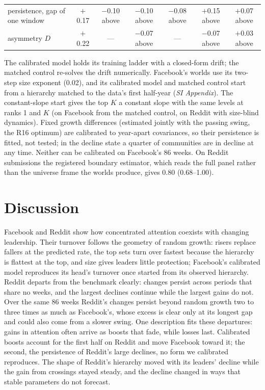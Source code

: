 \documentclass[9pt,twocolumn,twoside]{pnas-new}
\begin{document}
\begin{table}[tbp]
\begin{tabular}{lcccccc}
persistence, gap of one window & $+$0.17 & $-$0.10 above & $-$0.10 above & $-$0.08 above & $+$0.15 above & $+$0.07 above \\
asymmetry $D$ & $+$0.22 & --- & $-$0.07 above & --- & $-$0.07 above & $+$0.03 above \\
\end{tabular}
\vskip3pt\raggedright\footnotesize The calibrated model holds its training ladder with a closed-form drift; the matched control re-solves the drift numerically. Facebook's worlds use its two-step size exponent (0.02), and its calibrated model and matched control start from a hierarchy matched to the data's first half-year (\textit{SI Appendix}). The constant-slope start gives the top $K$ a constant slope with the same levels at ranks 1 and $K$ (on Facebook from the matched control, on Reddit with size-blind dynamics). Fixed growth differences (estimated jointly with the passing swing, the R16 optimum) are calibrated to year-apart covariances, so their persistence is fitted, not tested; in the decline state a quarter of communities are in decline at any time. Neither can be calibrated on Facebook's 86 weeks. On Reddit submissions the registered boundary estimator, which reads the full panel rather than the universe frame the worlds produce, gives 0.80 (0.68--1.00).
\end{table}

\section*{Discussion}
Facebook and Reddit show how concentrated attention coexists with changing leadership. Their turnover follows the geometry of random growth: risers replace fallers at the predicted rate, the top sets turn over fastest because the hierarchy is flattest at the top, and size gives leaders little protection; Facebook's calibrated model reproduces its head's turnover once started from its observed hierarchy. Reddit departs from the benchmark clearly: changes persist across periods that share no weeks, and the largest declines continue while the largest gains do not. Over the same 86 weeks Reddit's changes persist beyond random growth two to three times as much as Facebook's, whose excess is clear only at its longest gap and could also come from a slower swing. One description fits these departures: gains in attention often arrive as boosts that fade, while losses last. Calibrated boosts account for the first half on Reddit and move Facebook toward it; the second, the persistence of Reddit's large declines, no form we calibrated reproduces. The shape of Reddit's hierarchy moved with its leaders' decline while the gain from crossings stayed steady, and the decline changed in ways that stable parameters do not forecast.
\end{document}
